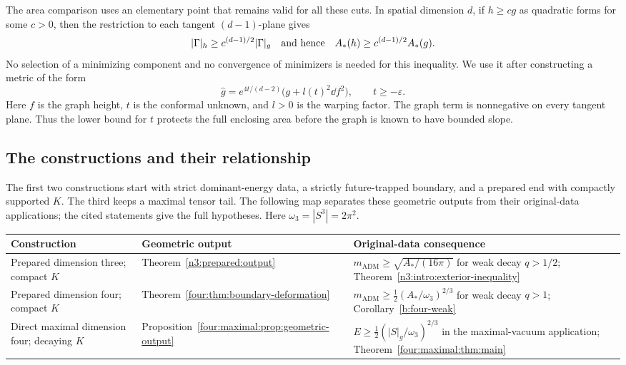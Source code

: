 The area comparison uses an elementary point that remains valid for all
these cuts.  In spatial dimension $d$, if $h\ge c g$ as quadratic forms
for some $c>0$, then the restriction to each tangent $(d-1)$-plane gives
\[
 |\Gamma|_h\ge c^{(d-1)/2}|\Gamma|_g
 \quad\hbox{and hence}\quad
 A_*(h)\ge c^{(d-1)/2}A_*(g).
\]
No selection of a minimizing component and no convergence of minimizers
is needed for this inequality.  We use it after constructing a metric
of the form
\[
 \widehat g=e^{4t/(d-2)}\bigl(g+l(t)^2\dd f^2\bigr),
 \qquad t\ge-\varepsilon.
\]
Here $f$ is the graph height, $t$ is the conformal unknown, and $l>0$
is the warping factor.
The graph term is nonnegative on every tangent plane.  Thus the lower
bound for $t$ protects the full enclosing area before the graph is
known to have bounded slope.

\subsection{The constructions and their relationship}

The first two constructions start with strict dominant-energy data,
a strictly future-trapped boundary, and a prepared end with compactly
supported $K$. The third keeps a maximal tensor tail. The following
map separates these geometric outputs from their original-data
applications; the cited statements give the full hypotheses.
Here $\omega_3=|S^3|=2\pi^2$.

\begin{center}
\small
\renewcommand{\arraystretch}{1.2}
\begin{tabular}{@{}p{.25\linewidth}p{.30\linewidth}p{.37\linewidth}@{}}
\toprule
Construction & Geometric output & Original-data consequence \\
\midrule
Prepared dimension three; compact $K$
& Theorem~\ref{n3:prepared:output}
& $m_{\mathrm{ADM}}\ge\sqrt{A_*/(16\pi)}$ for weak decay $q>1/2$;
Theorem~\ref{n3:intro:exterior-inequality} \\[3pt]
Prepared dimension four; compact $K$
& Theorem~\ref{four:thm:boundary-deformation}
& $m_{\mathrm{ADM}}\ge\frac12(A_*/\omega_3)^{2/3}$ for weak decay $q>1$;
Corollary~\ref{b:four-weak} \\[3pt]
Direct maximal dimension four; decaying $K$
& Proposition~\ref{four:maximal:prop:geometric-output}
& $E\ge\frac12(|S|_g/\omega_3)^{2/3}$ in the maximal-vacuum application;
Theorem~\ref{four:maximal:thm:main} \\
\bottomrule
\end{tabular}
\end{center}

